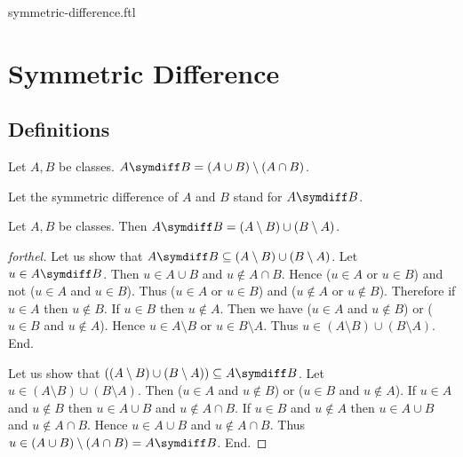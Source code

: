 \documentclass{naproche-library}
\begin{document}
\begin{smodule}{symmetric-difference.ftl}


  \section*{Symmetric Difference}

  \subsection*{Definitions}

  \begin{definition}[forthel,id=FOUNDATIONS_03_7457594151010304,printid]
    Let $A, B$ be classes.
    $A \symdiff B = (A \cup B) \setminus (A \cap B)$.

    Let the symmetric difference of $A$ and $B$ stand for $A \symdiff B$.
  \end{definition}

  \begin{proposition}[forthel,id=FOUNDATIONS_03_4886447211413504,printid]
    Let $A, B$ be classes.
    Then $A \symdiff B = (A \setminus B) \cup (B \setminus A)$.
  \end{proposition}
  \begin{proof}[forthel]
    Let us show that $A \symdiff B \subseteq (A \setminus B) \cup (B \setminus A)$.
      Let $u \in A \symdiff B$.
      Then $u \in A \cup B$ and $u \notin A \cap B$.
      Hence ($u \in A$ or $u \in B$) and not ($u \in A$ and $u \in B$).
      Thus ($u \in A$ or $u \in B$) and ($u \notin A$ or $u \notin B$).
      Therefore if $u \in A$ then $u \notin B$.
      If $u \in B$ then $u \notin A$.
      Then we have ($u \in A$ and $u \notin B$) or ($u \in B$ and $u \notin A$).
      Hence $u \in A \setminus B$ or $u \in B \setminus A$.
      Thus $u \in (A \setminus B) \cup (B \setminus A)$.
    End.

    Let us show that $((A \setminus B) \cup (B \setminus A)) \subseteq A \symdiff B$. %
      Let $u \in (A \setminus B) \cup (B \setminus A)$.
      Then ($u \in A$ and $u \notin B$) or ($u \in B$ and $u \notin A$).
      If $u \in A$ and $u \notin B$ then $u \in A \cup B$ and $u \notin A \cap B$.
      If $u \in B$ and $u \notin A$ then $u \in A \cup B$ and $u \notin A \cap B$.
      Hence $u \in A \cup B$ and $u \notin A \cap B$.
      Thus $u \in (A \cup B) \setminus (A \cap B) = A \symdiff B$.
    End.
  \end{proof}



\end{smodule}
\end{document}
